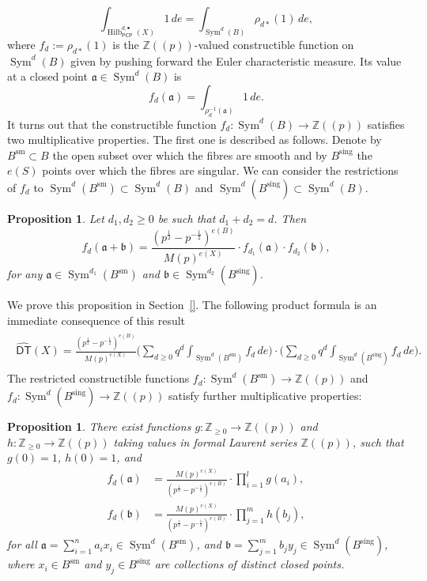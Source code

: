 \documentclass{amsart}
\newtheorem{proposition}[theorem]{Proposition}
\theoremstyle{definition}
\newcommand{\ZZ} {\mathbb{Z}}		%
\newcommand{\Sym}{\operatorname{Sym}}
\newcommand{\Hilb}{\operatorname{Hilb}}
\newcommand{\DT}{\mathsf{DT}}
\newcommand{\sm}{\operatorname{sm}}
\newcommand{\sing}{\operatorname{sing}}
\newcommand{\DThat}{\widehat{\DT}}
\newcommand{\PCP}{\mathsf{PCP}}
\begin{document}
$$
\int_{\Hilb^{d,\bullet}_{\PCP }(X)} 1 \, de = \int_{\Sym^d(B)} \rho_{d*}(1) \, de,
$$
where $f_d:= \rho_{d*}(1)$ is the $\ZZ ((p))$-valued constructible function on
$\Sym^d(B)$ given by pushing forward the Euler characteristic
measure\cite{MacPherson-Annals74}. Its value at a closed point
$\mathfrak{a} \in \Sym^d(B)$ is
$$
f_d(\mathfrak{a}) = \int_{\rho_{d}^{-1}(\mathfrak{a})} 1 \, de.
$$
It turns out that the constructible function $f_d : \Sym^d(B)
\rightarrow \ZZ(\!(p)\!)$ satisfies two multiplicative properties. The
first one is described as follows. Denote by $B^{\sm} \subset B$ the
open subset over which the fibres are smooth and by $B^{\sing}$ the
$e(S)$ points over which the fibres are singular. We can consider the
restrictions of $f_d$ to $\Sym^d(B^{\sm}) \subset \Sym^d(B)$ and
$\Sym^d(B^{\sing}) \subset \Sym^d(B)$.
\begin{proposition} \label{mult1}
Let $d_1, d_2 \geq 0$ be such that $d_1+d_2 = d$. Then 
$$ 
f_d(\mathfrak{a} + \mathfrak{b}) =\frac{(p^{\frac{1}{2}} - p^{-\frac{1}{2}})^{e(B)}}{M(p)^{e(X)}} \cdot f_{d_1}(\mathfrak{a}) \cdot f_{d_2}(\mathfrak{b}), 
$$
for any $\mathfrak{a} \in \Sym^{d_1}(B^{\sm})$ and $\mathfrak{b} \in \Sym^{d_2}(B^{\sing})$. 
\end{proposition}
We prove this proposition in Section~\ref{}. The following
product formula is an immediate consequence of this result
\begin{align}
\begin{split} \label{firstprod}
\DThat (X)  = \frac{(p^{\frac{1}{2}} - p^{-\frac{1}{2}})^{e(B)}}{M(p)^{e(X)}}  \Bigg( \sum_{d \geq 0} q^d \int_{\Sym^d(B^{\sm})} f_d \, de \Bigg) \cdot \Bigg( \sum_{d \geq 0} q^d \int_{\Sym^d(B^{\sing})} f_d \, de \Bigg). 
\end{split}
\end{align}
The restricted constructible functions $f_d : \Sym^d(B^{\sm})
\rightarrow \ZZ(\!(p)\!)$ and $f_d : \Sym^d(B^{\sing}) \rightarrow
\ZZ(\!(p)\!)$ satisfy further multiplicative properties:
\begin{proposition} \label{mult2}
There exist functions $g : \ZZ_{\geq 0} \rightarrow \ZZ(\!(p)\!)$ and
$h : \ZZ_{\geq 0} \rightarrow \ZZ(\!(p)\!)$ taking values in formal
Laurent series $\ZZ(\!(p)\!)$, such that $g(0)=1$, $h(0)=1$, and
\begin{align*}
f_{d}(\mathfrak{a}) &= \frac{M(p)^{e(X)}}{(p^{\frac{1}{2}} - p^{-\frac{1}{2}})^{e(B)}} \cdot \prod_{i=1}^l g(a_i), \\
f_{d}(\mathfrak{b}) &= \frac{M(p)^{e(X)}}{(p^{\frac{1}{2}} -
p^{-\frac{1}{2}})^{e(B)}} \cdot \prod_{j=1}^m h(b_j),
\end{align*}
for all $\mathfrak{a} = \sum_{i=1}^{n} a_i x_i \in \Sym^{d}(B^{\sm})$,
and $\mathfrak{b} = \sum_{j=1}^m b_j y_j \in \Sym^{d}(B^{\sing})$,
where $x_i \in B^{\sm}$ and $y_j \in B^{\sing}$ are collections of
distinct closed points.
\end{proposition}
\end{document}
